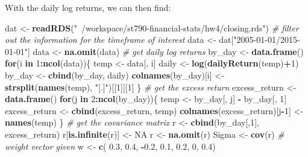 \documentclass[11pt,]{article}
\newenvironment{Shaded}{\begin{snugshade}}{\end{snugshade}}
\newcommand{\KeywordTok}[1]{\textcolor[rgb]{0.13,0.29,0.53}{\textbf{#1}}}
\newcommand{\DecValTok}[1]{\textcolor[rgb]{0.00,0.00,0.81}{#1}}
\newcommand{\FloatTok}[1]{\textcolor[rgb]{0.00,0.00,0.81}{#1}}
\newcommand{\StringTok}[1]{\textcolor[rgb]{0.31,0.60,0.02}{#1}}
\newcommand{\CommentTok}[1]{\textcolor[rgb]{0.56,0.35,0.01}{\textit{#1}}}
\newcommand{\OtherTok}[1]{\textcolor[rgb]{0.56,0.35,0.01}{#1}}
\newcommand{\ControlFlowTok}[1]{\textcolor[rgb]{0.13,0.29,0.53}{\textbf{#1}}}
\newcommand{\OperatorTok}[1]{\textcolor[rgb]{0.81,0.36,0.00}{\textbf{#1}}}
\newcommand{\NormalTok}[1]{#1}
\renewenvironment{quote}{\begin{shaded*}}{\end{shaded*}}
\begin{document}
\begin{quote}
With the daily log returns, we can then find:
\end{quote}

\begin{Shaded}
\begin{Highlighting}[]
\NormalTok{dat <-}\StringTok{ }\KeywordTok{readRDS}\NormalTok{(}\StringTok{"~/workspace/st790-financial-stats/hw4/closing.rds"}\NormalTok{)}
\CommentTok{# filter out the information for the timeframe of interest }
\NormalTok{data <-}\StringTok{ }\NormalTok{dat[}\StringTok{"2005-01-01/2015-01-01"}\NormalTok{]}
\NormalTok{data <-}\StringTok{ }\KeywordTok{na.omit}\NormalTok{(data)}
\CommentTok{# get daily log returns }
\NormalTok{by_day <-}\StringTok{ }\KeywordTok{data.frame}\NormalTok{() }
\ControlFlowTok{for}\NormalTok{(i }\ControlFlowTok{in} \DecValTok{1}\OperatorTok{:}\KeywordTok{ncol}\NormalTok{(data))\{}
\NormalTok{  temp <-}\StringTok{ }\NormalTok{data[, i]}
\NormalTok{  daily <-}\StringTok{ }\KeywordTok{log}\NormalTok{(}\KeywordTok{dailyReturn}\NormalTok{(temp)}\OperatorTok{+}\DecValTok{1}\NormalTok{)}
\NormalTok{  by_day <-}\StringTok{ }\KeywordTok{cbind}\NormalTok{(by_day, daily)}
  \KeywordTok{colnames}\NormalTok{(by_day)[i] <-}\StringTok{ }\KeywordTok{strsplit}\NormalTok{(}\KeywordTok{names}\NormalTok{(temp), }\StringTok{"[.]"}\NormalTok{)[[}\DecValTok{1}\NormalTok{]][}\DecValTok{1}\NormalTok{]}
\NormalTok{\}}
\CommentTok{# get the excess return }
\NormalTok{excess_return <-}\StringTok{ }\KeywordTok{data.frame}\NormalTok{()}
\ControlFlowTok{for}\NormalTok{(j }\ControlFlowTok{in} \DecValTok{2}\OperatorTok{:}\KeywordTok{ncol}\NormalTok{(by_day))\{}
\NormalTok{  temp <-}\StringTok{ }\NormalTok{by_day[, j] }\OperatorTok{-}\StringTok{ }\NormalTok{by_day[, }\DecValTok{1}\NormalTok{]}
\NormalTok{  excess_return <-}\StringTok{ }\KeywordTok{cbind}\NormalTok{(excess_return, temp)}
  \KeywordTok{colnames}\NormalTok{(excess_return)[j}\OperatorTok{-}\DecValTok{1}\NormalTok{] <-}\StringTok{ }\KeywordTok{names}\NormalTok{(temp)}
\NormalTok{\}}
\CommentTok{# get the covariance matrix }
\NormalTok{r <-}\StringTok{ }\KeywordTok{cbind}\NormalTok{(by_day[,}\DecValTok{1}\NormalTok{], excess_return)}
\NormalTok{r[}\KeywordTok{is.infinite}\NormalTok{(r)] <-}\StringTok{ }\OtherTok{NA}
\NormalTok{r <-}\StringTok{ }\KeywordTok{na.omit}\NormalTok{(r)}
\NormalTok{Sigma <-}\StringTok{ }\KeywordTok{cov}\NormalTok{(r)}
\CommentTok{# weight vector given }
\NormalTok{w <-}\StringTok{ }\KeywordTok{c}\NormalTok{( }\FloatTok{0.3}\NormalTok{, }\FloatTok{0.4}\NormalTok{, }\OperatorTok{-}\FloatTok{0.2}\NormalTok{, }\FloatTok{0.1}\NormalTok{, }\FloatTok{0.2}\NormalTok{, }\DecValTok{0}\NormalTok{, }\FloatTok{0.4}\NormalTok{)}

\end{Highlighting}
\end{Shaded}
\end{document}
